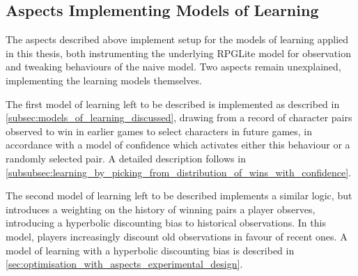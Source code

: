 \subsection{Aspects Implementing Models of Learning}\label{subsec:aspects_modelling_learning}


The aspects described above implement setup for the models of learning applied in this thesis,
both instrumenting the underlying RPGLite model for observation and tweaking behaviours of the naive model.
Two aspects remain unexplained, implementing the learning models themselves.

The first model of learning left to be described is implemented as described in
\cref{subsec:models_of_learning_discussed}, drawing from a record of character pairs observed to win
in earlier games to select characters in future games, in accordance with a model of confidence which activates
either this behaviour or a randomly selected pair. A detailed description follows in
\cref{subsubsec:learning_by_picking_from_distribution_of_wins_with_confidence}.

The second model of learning left to be described
implements a similar logic, but introduces a weighting on the history of winning pairs a player
observes, introducing a hyperbolic discounting bias to historical observations. 
In this model, players increasingly discount old observations in favour of recent ones. A model of learning with
a hyperbolic discounting bias is described in
\cref{sec:optimisation_with_aspects_experimental_design}.



